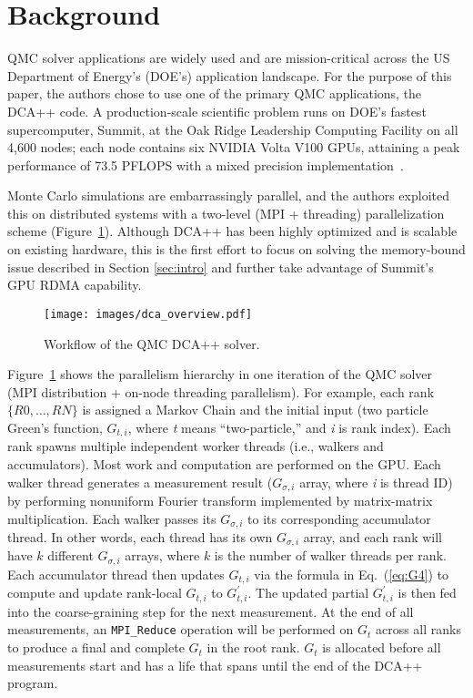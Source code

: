 \section{Background}
\label{sec:background}

QMC solver applications are widely used and are mission-critical across the US Department
of Energy's (DOE's) application landscape. For the purpose of this paper, the authors chose to use one of the
primary QMC applications,
the DCA++ code.
A production-scale scientific
problem runs on DOE's fastest supercomputer, Summit, at the Oak Ridge Leadership Computing Facility on all 4,600
nodes; each node contains six NVIDIA Volta V100 GPUs, attaining a peak performance of 73.5 PFLOPS with a mixed
precision implementation~\cite{dca2019}.

Monte Carlo simulations are embarrassingly parallel, and the authors exploited this on distributed systems with a two-level
(MPI + threading) parallelization scheme (Figure~\ref{fig:dca_overview}). Although DCA++ has 
been highly optimized and is scalable on existing hardware, this is the first effort to focus on 
solving the memory-bound issue described in Section \ref{sec:intro} and further take advantage 
of Summit's GPU RDMA capability. 

\begin{figure}[h]
	\centering
	\texttt{[image: images/dca\_overview.pdf]}
	\caption{Workflow of the QMC DCA++ solver.}%
	\label{fig:dca_overview}
\end{figure}


Figure~\ref{fig:dca_overview} shows the parallelism
hierarchy in one iteration of the QMC solver (MPI
distribution + on-node threading parallelism). 
%
For example, each rank $\{R0,\ldots,RN\}$ 
is assigned a Markov Chain and the initial input (two particle
Green's function, $G_{t,i}$, where \textit{t} means ``two-particle,'' 
and \textit{i} is rank index).  Each rank spawns multiple independent
worker threads (i.e., walkers and accumulators). 
%
Most work and computation are performed on the GPU. 
%
Each walker thread generates a measurement
result ($G_{\sigma, i}$ array, where \textit{i} is thread ID) by performing 
nonuniform Fourier transform implemented by matrix-matrix multiplication.
%
Each walker passes its $G_{\sigma, i}$ to its corresponding accumulator
thread. 
%
In other words, each thread has its own $G_{\sigma, i}$ array,
and each rank will have $k$ different $G_{\sigma, i}$ arrays, where $k$
is the number of walker threads per rank. 
%
Each accumulator thread then updates $G_{t,i}$ via the formula in Eq.~(\ref{eq:G4})
to compute and update rank-local
$G_{t,i}$ to $G^{\prime}_{t,i}$.  
%
The updated partial $G^{\prime}_{t,i}$ is then fed
into the coarse-graining step for the next measurement. At the end
of all measurements, an \texttt{MPI\_Reduce} operation will be
performed on $G_t$ across all ranks to produce a final and complete
$G_{t}$ in the root rank. 
%
$G_t$ is allocated before all measurements start and has a life that spans
until the end of the DCA++ program.
%


